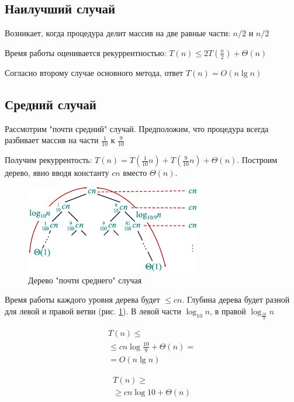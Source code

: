 \documentclass[11pt]{article}
\begin{document}
\subsection{Наилучший случай}

Возникает, когда процедура делит массив на две равные части: $n/2$ и $n/2$

Время работы оценивается рекуррентностью: $T(n) \leqslant 2T(\frac{n}{2}) + \Theta(n)$

Согласно второму случае основного метода, ответ $T(n) = O(n \lg n)$

\subsection{Средний случай}

Рассмотрим "почти средний" случай. Предположим, что процедура всегда разбивает массив на части $\frac{1}{10}$ к $\frac{9}{10}$

Получим рекуррентость: $T(n) = T(\frac{1}{10} n) + T(\frac{9}{10} n) + \Theta(n)$. Построим дерево, явно вводя константу $c n$ вместо $\Theta(n)$.

\begin{figure}[ht]
  \centering
  \includegraphics[width=3in]{lecture4/tree2.eps}
  \caption{Дерево "почти среднего" случая}
  \label{fig:tree2}
\end{figure}

Время работы каждого уровня дерева будет $\leqslant c n$. Глубина дерева будет разной для левой и правой ветви (рис. \ref{fig:tree2}). В левой части $\log_{10} n$, в правой $\log_{\frac{10}{9}} n$

\begin{align*}
  T(n) \leqslant \\
    \leqslant c n \log{\frac{10}{9}} + \Theta(n) = \\
    = O(n \lg n)
\end{align*}

\begin{align*}
  T(n) \geqslant \\
    \geqslant c n \log{10} + \Theta(n)
\end{align*}
\end{document}

